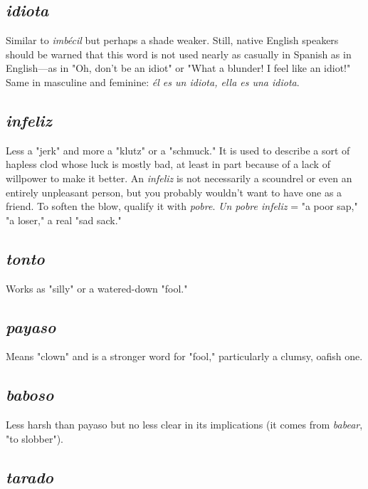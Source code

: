 \documentclass[14pt,a4paper,oneside]{memoir}
\begin{document}
\subsection{\emph{idiota}}

Similar to \emph{imbécil} but perhaps a shade weaker. Still,
native English speakers should be warned that this word is not used
nearly as casually in Spanish as in English---as in "Oh, don't be an
idiot" or "What a blunder! I feel like an idiot!" Same in masculine and
feminine: \emph{él es un idiota, ella es una idiota}.

\subsection{\emph{infeliz}}

Less a "jerk" and more a "klutz" or a "schmuck." It
is used to describe a sort of hapless clod whose luck is mostly bad, at
least in part because of a lack of willpower to make it better. An \emph{infeliz}
is not necessarily a scoundrel or even an entirely unpleasant person,
but you probably wouldn't want to have one as a friend. To soften the
blow, qualify it with \emph{pobre}. \emph{Un pobre infeliz} = "a poor sap," "a loser," a real "sad sack."

\subsection{\emph{tonto}}

Works as "silly" or a watered-down "fool."

\subsection{\emph{payaso}}

Means "clown" and is a stronger word for "fool,"
particularly a clumsy, oafish one.

\subsection{\emph{baboso}}

Less harsh than payaso but no less clear in its implications (it comes from \emph{babear}, "to slobber").

\subsection{\emph{tarado}}
\end{document}
